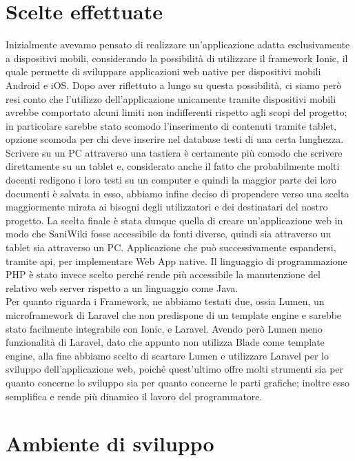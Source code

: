 \documentclass[twoside]{supsistudent}
\begin{document}
\section{Scelte effettuate}
Inizialmente avevamo pensato di realizzare un’applicazione adatta esclusivamente a dispositivi mobili, considerando la possibilità di utilizzare il framework Ionic, il quale permette di sviluppare applicazioni web native per dispositivi mobili Android e iOS. Dopo aver riflettuto a lungo su questa possibilità, ci siamo però resi conto che l’utilizzo dell’applicazione unicamente tramite dispositivi mobili avrebbe comportato alcuni limiti non indifferenti rispetto agli scopi del progetto; in particolare sarebbe stato scomodo l'inserimento di contenuti tramite tablet, opzione scomoda per chi deve inserire nel database testi di una certa lunghezza. Scrivere su un PC attraverso una tastiera è certamente più comodo che scrivere direttamente su un tablet e, considerato anche il fatto che probabilmente molti docenti redigono i loro testi su un computer e quindi la maggior parte dei loro documenti è salvata in esso, abbiamo infine deciso di propendere verso una scelta maggiormente mirata ai bisogni degli utilizzatori e dei destinatari del nostro progetto. La scelta finale è stata dunque quella di creare un’applicazione web in modo che SaniWiki fosse accessibile da fonti diverse, quindi sia attraverso un tablet sia attraverso un PC. Applicazione che può successivamente espandersi, tramite api, per implementare Web App native.
Il linguaggio di programmazione PHP è stato invece scelto perché rende più accessibile la manutenzione del relativo web server rispetto a un linguaggio come Java.\\
Per quanto riguarda i Framework, ne abbiamo testati due, ossia Lumen, un microframework di Laravel che non predispone di un template engine e sarebbe stato facilmente integrabile con Ionic, e Laravel. Avendo però Lumen meno funzionalità di Laravel, dato che appunto non utilizza Blade come template engine, alla fine abbiamo scelto di scartare Lumen e utilizzare Laravel per lo sviluppo dell'applicazione web, poiché quest'ultimo offre molti strumenti sia per quanto concerne lo sviluppo sia per quanto concerne le parti grafiche; inoltre esso semplifica e rende più dinamico il lavoro del programmatore.

\section{Ambiente di sviluppo}
\end{document}
